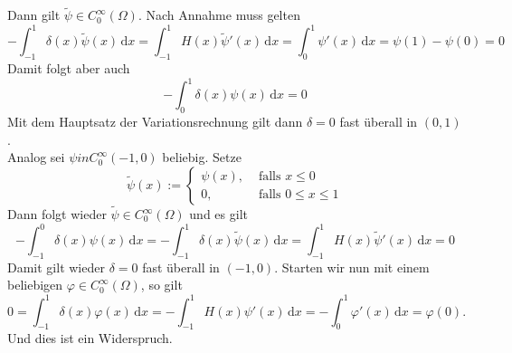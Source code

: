 \begin{beispiel}
\begin{enumerate}[(i)]
		Dann gilt $\tilde \psi \in C^{\infty}_0(\Omega)$. Nach Annahme muss gelten
		\[
			- \int_{-1}^{1} \delta (x) \tilde \psi(x) \,\mathrm{d}x = \int_{-1}^{1} H(x) \tilde \psi'(x) \,\mathrm{d}x = \int_{0}^{1} \psi'(x) \,\mathrm{d}x = \psi(1)-\psi(0) = 0
		\]
		Damit folgt aber auch
		\[
			- \int_{0}^{1}\delta (x) \psi(x) \,\mathrm{d}x = 0
		\]
		Mit dem Hauptsatz der Variationsrechnung gilt dann $\delta =0$ fast überall in $(0,1)$. \\
		Analog sei $\psi in C^{\infty}_0(-1,0)$ beliebig. Setze
		\[
			\tilde \psi(x) := \begin{cases}
				\psi(x), &\text{ falls }x \leq 0\\
				0, &\text{ falls } 0 \leq x \leq 1
			\end{cases}
		\]
		Dann folgt wieder $ \tilde \psi \in C^{\infty}_0(\Omega)$ und es gilt
		\[
			- \int_{-1}^{0}\delta (x) \psi(x) \,\mathrm{d}x = - \int_{-1}^{1} \delta (x)  \tilde \psi(x) \,\mathrm{d}x = \int_{-1}^{1} H(x) \tilde \psi'(x) \,\mathrm{d}x = 0
		\]
		Damit gilt wieder $\delta  =0$ fast überall in $(-1,0)$. Starten wir nun mit einem beliebigen $\varphi \in C^{\infty}_0(\Omega)$, so gilt
		\[
			0 = \int_{-1}^{1} \delta (x) \varphi(x) \,\mathrm{d}x = - \int_{-1}^{1}H(x) \psi'(x) \,\mathrm{d}x = - \int_{0}^{1} \varphi'(x) \,\mathrm{d}x = \varphi(0).
		\]
		Und dies ist ein Widerspruch. 
	\end{enumerate}
\end{beispiel}

